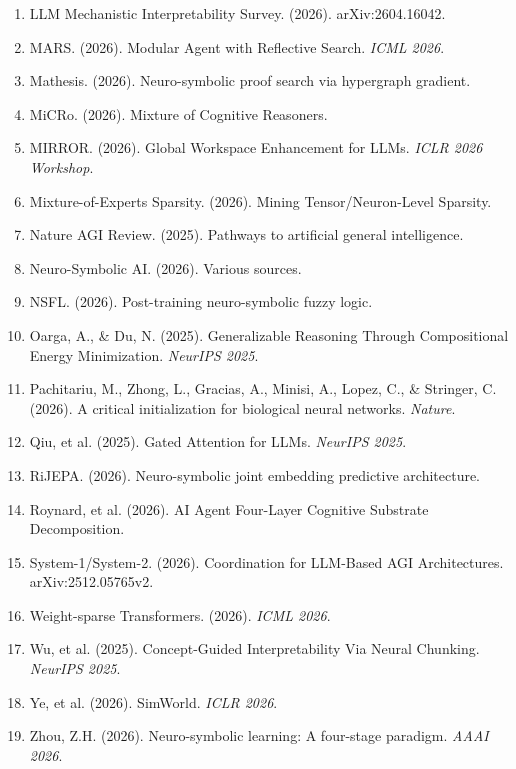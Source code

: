 \documentclass[11pt,a4paper]{article}
\theoremstyle{definition}
\theoremstyle{remark}
\begin{document}
\begin{enumerate}
    \item LLM Mechanistic Interpretability Survey. (2026). arXiv:2604.16042.
    \item MARS. (2026). Modular Agent with Reflective Search. \textit{ICML 2026}.
    \item Mathesis. (2026). Neuro-symbolic proof search via hypergraph gradient.
    \item MiCRo. (2026). Mixture of Cognitive Reasoners.
    \item MIRROR. (2026). Global Workspace Enhancement for LLMs. \textit{ICLR 2026 Workshop}.
    \item Mixture-of-Experts Sparsity. (2026). Mining Tensor/Neuron-Level Sparsity.
    \item Nature AGI Review. (2025). Pathways to artificial general intelligence.
    \item Neuro-Symbolic AI. (2026). Various sources.
    \item NSFL. (2026). Post-training neuro-symbolic fuzzy logic.
    \item Oarga, A., \& Du, N. (2025). Generalizable Reasoning Through Compositional Energy Minimization. \textit{NeurIPS 2025}.
    \item Pachitariu, M., Zhong, L., Gracias, A., Minisi, A., Lopez, C., \& Stringer, C. (2026). A critical initialization for biological neural networks. \textit{Nature}.
    \item Qiu, et al. (2025). Gated Attention for LLMs. \textit{NeurIPS 2025}.
    \item RiJEPA. (2026). Neuro-symbolic joint embedding predictive architecture.
    \item Roynard, et al. (2026). AI Agent Four-Layer Cognitive Substrate Decomposition.
    \item System-1/System-2. (2026). Coordination for LLM-Based AGI Architectures. arXiv:2512.05765v2.
    \item Weight-sparse Transformers. (2026). \textit{ICML 2026}.
    \item Wu, et al. (2025). Concept-Guided Interpretability Via Neural Chunking. \textit{NeurIPS 2025}.
    \item Ye, et al. (2026). SimWorld. \textit{ICLR 2026}.
    \item Zhou, Z.H. (2026). Neuro-symbolic learning: A four-stage paradigm. \textit{AAAI 2026}.
\end{enumerate}

\newpage
\appendix
\end{document}
